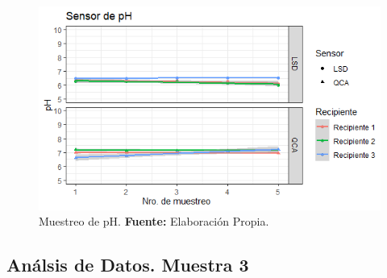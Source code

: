 \begin{figure}[H]
        \centering
        \includegraphics[width=0.75\linewidth]{Imagenes/cap4/pH_M3.png}
        \caption {Muestreo de pH. \textbf{Fuente:}
        Elaboraci\'on Propia. }
        \label{fig:M3PH}
    \end{figure}

\subsection{An\'alsis de Datos. Muestra 3}

